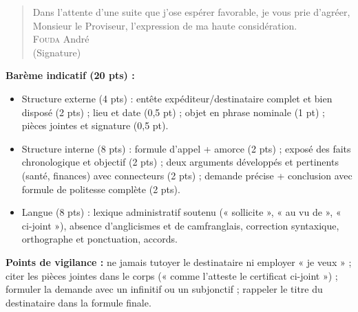 \documentclass[11pt]{article}
\begin{document}
\begin{corrige}
\begin{quote}
Dans l'attente d'une suite que j'ose espérer favorable, je vous prie d'agréer, Monsieur le Proviseur, l'expression de ma haute considération.\\[0.8em]
\hspace*{8cm}\textsc{Fouda} André\\
\hspace*{8cm}(Signature)
\end{quote}
\textbf{Barème indicatif (20 pts) :}
\begin{itemize}
    \item Structure externe (4 pts) : entête expéditeur/destinataire complet et bien disposé (2 pts) ; lieu et date (0,5 pt) ; objet en phrase nominale (1 pt) ; pièces jointes et signature (0,5 pt).
    \item Structure interne (8 pts) : formule d'appel + amorce (2 pts) ; exposé des faits chronologique et objectif (2 pts) ; deux arguments développés et pertinents (santé, finances) avec connecteurs (2 pts) ; demande précise + conclusion avec formule de politesse complète (2 pts).
    \item Langue (8 pts) : lexique administratif soutenu (« sollicite », « au vu de », « ci-joint »), absence d'anglicismes et de camfranglais, correction syntaxique, orthographe et ponctuation, accords.
\end{itemize}
\textbf{Points de vigilance :} ne jamais tutoyer le destinataire ni employer « je veux » ; citer les pièces jointes dans le corps (« comme l'atteste le certificat ci-joint ») ; formuler la demande avec un infinitif ou un subjonctif ; rappeler le titre du destinataire dans la formule finale.
\end{corrige}
\end{document}
